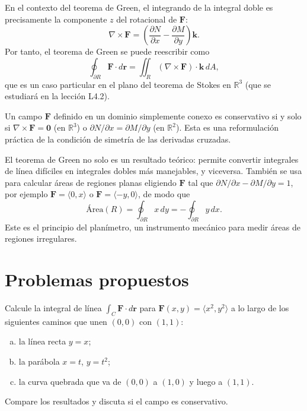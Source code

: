 En el contexto del teorema de Green, el integrando de la integral doble
es precisamente la componente $z$ del rotacional de $\mathbf{F}$:
\[
\nabla \times \mathbf{F} = \left( \frac{\partial N}{\partial x}
- \frac{\partial M}{\partial y} \right) \mathbf{k}.
\]
Por tanto, el teorema de Green se puede reescribir como
\[
\oint_{\partial R} \mathbf{F} \cdot d\mathbf{r}
= \iint_R (\nabla \times \mathbf{F}) \cdot \mathbf{k} \, dA,
\]
que es un caso particular en el plano del teorema de Stokes en
$\mathbb{R}^3$ (que se estudiará en la lección L4.2).

\begin{rem}
Un campo $\mathbf{F}$ definido en un dominio simplemente conexo es
conservativo si y solo si $\nabla \times \mathbf{F} = \mathbf{0}$
(en $\mathbb{R}^3$) o $\partial N/\partial x = \partial M/\partial y$
(en $\mathbb{R}^2$). Esta es una reformulación práctica de la condición
de simetría de las derivadas cruzadas.
\end{rem}

\begin{rem}
El teorema de Green no solo es un resultado teórico: permite convertir
integrales de línea difíciles en integrales dobles más manejables, y
viceversa. También se usa para calcular áreas de regiones planas
eligiendo $\mathbf{F}$ tal que $\partial N/\partial x - \partial
M/\partial y = 1$, por ejemplo $\mathbf{F} = \langle 0, x \rangle$ o
$\mathbf{F} = \langle -y, 0 \rangle$, de modo que
\[
\text{Área}(R) = \oint_{\partial R} x\,dy = -\oint_{\partial R} y\,dx.
\]
Este es el principio del planímetro, un instrumento mecánico para medir
áreas de regiones irregulares.
\end{rem}

\section{Problemas propuestos}

\begin{prob}
Calcule la integral de línea $\int_C \mathbf{F}\cdot d\mathbf{r}$ para
$\mathbf{F}(x,y)=\langle x^2, y^2 \rangle$ a lo largo de los siguientes
caminos que unen $(0,0)$ con $(1,1)$:
\begin{enumerate}[(a)]
    \item la línea recta $y=x$;
    \item la parábola $x=t$, $y=t^2$;
    \item la curva quebrada que va de $(0,0)$ a $(1,0)$ y luego a $(1,1)$.
\end{enumerate}
Compare los resultados y discuta si el campo es conservativo.
\end{prob}

